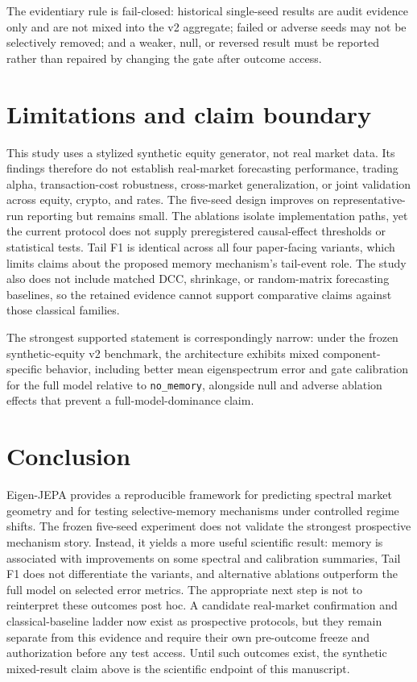 \documentclass[11pt]{article}
\begin{document}
The evidentiary rule is fail-closed: historical single-seed results are audit evidence only and are not mixed into the v2 aggregate; failed or adverse seeds may not be selectively removed; and a weaker, null, or reversed result must be reported rather than repaired by changing the gate after outcome access.

\section{Limitations and claim boundary}
This study uses a stylized synthetic equity generator, not real market data. Its findings therefore do not establish real-market forecasting performance, trading alpha, transaction-cost robustness, cross-market generalization, or joint validation across equity, crypto, and rates. The five-seed design improves on representative-run reporting but remains small. The ablations isolate implementation paths, yet the current protocol does not supply preregistered causal-effect thresholds or statistical tests. Tail F1 is identical across all four paper-facing variants, which limits claims about the proposed memory mechanism's tail-event role. The study also does not include matched DCC, shrinkage, or random-matrix forecasting baselines, so the retained evidence cannot support comparative claims against those classical families.

The strongest supported statement is correspondingly narrow: under the frozen synthetic-equity v2 benchmark, the architecture exhibits mixed component-specific behavior, including better mean eigenspectrum error and gate calibration for the full model relative to \texttt{no\_memory}, alongside null and adverse ablation effects that prevent a full-model-dominance claim.

\section{Conclusion}
Eigen-JEPA provides a reproducible framework for predicting spectral market geometry and for testing selective-memory mechanisms under controlled regime shifts. The frozen five-seed experiment does not validate the strongest prospective mechanism story. Instead, it yields a more useful scientific result: memory is associated with improvements on some spectral and calibration summaries, Tail F1 does not differentiate the variants, and alternative ablations outperform the full model on selected error metrics. The appropriate next step is not to reinterpret these outcomes post hoc. A candidate real-market confirmation and classical-baseline ladder now exist as prospective protocols, but they remain separate from this evidence and require their own pre-outcome freeze and authorization before any test access. Until such outcomes exist, the synthetic mixed-result claim above is the scientific endpoint of this manuscript.
\end{document}
